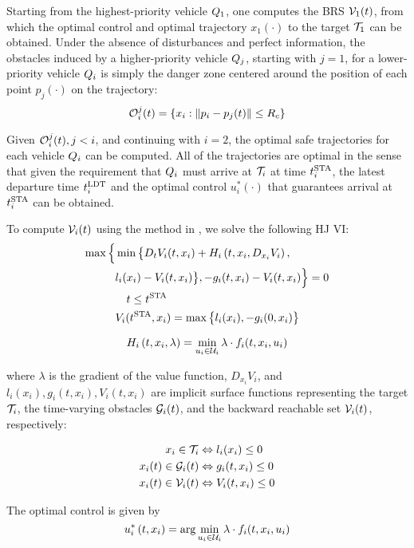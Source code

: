 Starting from the highest-priority vehicle $Q_1$, one computes the BRS $\mathcal{V}_1(t)$, from which the optimal control and optimal trajectory $x_1(\cdot)$ to the target $\mathcal{T}_1$ can be obtained. Under the absence of disturbances and perfect information, the obstacles induced by a higher-priority vehicle $Q_j$, starting with $j=1$, for a lower-priority vehicle $Q_i$ is simply the danger zone centered around the position of each point $p_j(\cdot)$ on the trajectory:
\vspace{-0.5em} 
\begin{equation}
\mathcal{O}_i^j(t) = \{x_i: \|p_i - p_j(t)\|\le R_c\}
\end{equation}

Given $\mathcal{O}_i^j(t), j<i$, and continuing with $i = 2$, the optimal safe trajectories for each vehicle $Q_i$ can be computed. All of the trajectories are optimal in the sense that given the requirement that $Q_i$ must arrive at $\mathcal{T}_i$ at time $t^\text{STA}_i$, the latest departure time $t^\text{LDT}_i$ and the optimal control $u^*_i(\cdot)$ that guarantees arrival at $t^\text{STA}_i$ can be obtained.

To compute $\mathcal{V}_i(t)$ using the method in \cite{Fisac15}, we solve the following HJ VI:
\vspace{-0.5em} 
\begin{equation}
\label{eq:HJIVI}
\begin{aligned}
\max\Big\{&\min\big\{D_t V_i(t, x_i) + H_i\left(t, x_i, D_{x_i} V_i\right), \\
&l_i(x_i) - V_i(t, x_i)\big\}, -g_i(t, x_i) - V_i(t, x_i)\Big\} = 0 \\
&\quad t\le t^\text{STA}\\
&V_i(t^\text{STA}, x_i) = \max\big\{l_i(x_i), -g_i(0, x_i)\big\}\\ 
\end{aligned}
\end{equation}

\begin{equation}
H_i\left(t, x_i, \lambda\right) = \min_{u_i \in \mathcal{U}_i} \lambda \cdot f_i(t, x_i, u_i)
\end{equation}

\noindent where $\lambda$ is the gradient of the value function, $D_{x_i} V_i$, and $l_i(x_i), g_i(t,x_i),V_i(t,x_i)$ are implicit surface functions representing the target $\mathcal{T}_i$, the time-varying obstacles $\mathcal{G}_i(t)$, and the backward reachable set $\mathcal{V}_i(t)$, respectively: 

\begin{equation}
\label{eq:impl_surf}
\begin{aligned}
x_i \in \mathcal{T}_i &\Leftrightarrow l_i(x_i) \le 0 \\
x_i(t) \in \mathcal{G}_i(t) &\Leftrightarrow g_i(t,x_i) \le 0 \\
x_i(t) \in \mathcal{V}_i(t) &\Leftrightarrow V_i(t, x_i) \le 0
\end{aligned}
\end{equation}

The optimal control is given by
 \vspace{-0.4em} 
\begin{equation}
\label{eq:optCtrl}
u^*_i\left(t, x_i\right) = \arg \min_{u_i \in \mathcal{U}_i} \lambda \cdot f_i(t, x_i, u_i)
\end{equation}